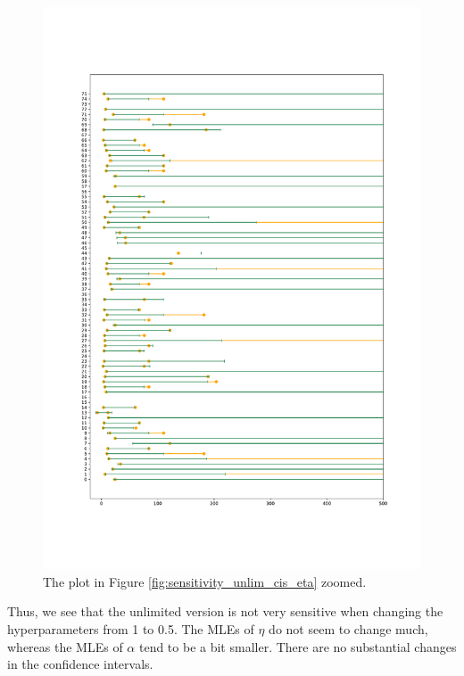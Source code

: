\begin{figure}
    \centering
    \includegraphics[scale=0.36]{pictures/Sensitivity/ci_unlim_eta_zoomed_pdf.pdf}
    \caption[CIs for $\eta$, unlimited. Zoomed]{The plot in Figure \ref{fig:sensitivity_unlim_cis_eta} zoomed.}
    \label{fig:sensitivity_unlim_cis_eta_zoomed}
\end{figure}

Thus, we see that the unlimited version is not very sensitive when changing the hyperparameters from 1 to 0.5. The MLEs of $\eta$ do not seem to change much, whereas the MLEs of $\alpha$ tend to be a bit smaller. There are no substantial changes in the confidence intervals. 




